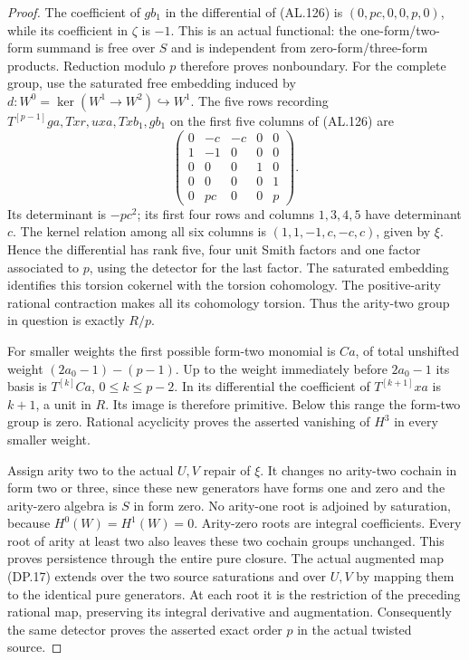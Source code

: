 \begin{proof}
The coefficient of $gb_1$ in the differential of (AL.126)
is $(0,pc,0,0,p,0)$, while its coefficient in $\zeta$ is $-1$.
This is an actual functional: the one-form/two-form summand
is free over $S$ and is independent from zero-form/three-form
products. Reduction modulo $p$ therefore proves nonboundary.
For the complete group, use the saturated free embedding
induced by $d:W^0=\ker(W^1\to W^2)\hookrightarrow W^1$.
The five rows recording $T^{[p-1]}ga,Txr,uxa,Txb_1,gb_1$
on the first five columns of (AL.126) are
\[
 \begin{pmatrix}
 0&-c&-c&0&0\\
 1&-1&0&0&0\\
 0&0&0&1&0\\
 0&0&0&0&1\\
 0&pc&0&0&p
 \end{pmatrix}.
 \tag{AL.127}
\]
Its determinant is $-pc^2$; its first four rows and
columns $1,3,4,5$ have determinant $c$.
The kernel relation among all six columns is
$(1,1,-1,c,-c,c)$, given by $\xi$.
Hence the differential has rank five, four unit Smith factors
and one factor associated to $p$, using the detector for the
last factor. The saturated embedding identifies this torsion
cokernel with the torsion cohomology. The positive-arity
rational contraction makes all its cohomology torsion.
Thus the arity-two group in question is exactly $R/p$.

For smaller weights the first possible form-two monomial is
$Ca$, of total unshifted weight $(2a_0-1)-(p-1)$.
Up to the weight immediately before $2a_0-1$ its basis is
$T^{[k]}Ca$, $0\leq k\leq p-2$. In its differential the
coefficient of $T^{[k+1]}xa$ is $k+1$, a unit in $R$.
Its image is therefore primitive. Below this range the
form-two group is zero. Rational acyclicity proves the
asserted vanishing of $H^3$ in every smaller weight.

Assign arity two to the actual $U,V$ repair of $\xi$.
It changes no arity-two cochain in form two or three,
since these new generators have forms one and zero and
the arity-zero algebra is $S$ in form zero.
No arity-one root is adjoined by saturation, because
$H^0(W)=H^1(W)=0$. Arity-zero roots are integral coefficients.
Every root of arity at least two also leaves these two
cochain groups unchanged. This proves persistence through
the entire pure closure. The actual augmented map (DP.17)
extends over the two source saturations and over $U,V$
by mapping them to the identical pure generators.
At each root it is the restriction of the preceding rational
map, preserving its integral derivative and augmentation.
Consequently the same detector proves the asserted exact
order $p$ in the actual twisted source.


\end{proof}
